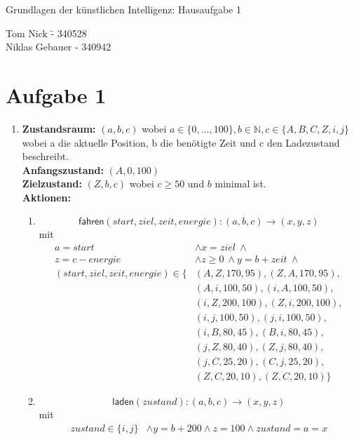 \documentclass[a4paper,10pt]{article}
\newcommand{\N}{\mathbb{N}}
\begin{document}
\begin{center}
\Large{Grundlagen der künstlichen Intelligenz: Hausaufgabe 1} \\
\end{center}
\begin{tabbing}
Tom Nick \hspace{2cm}\= - 340528\\
Niklas Gebauer \> - 340942 \\
\end{tabbing}

\section*{Aufgabe 1}

\begin{enumerate}[~~a)]
	\item
	\textbf{Zustandsraum:} 
	$(a, b, c)$ wobei $ a \in \{0,\dots,100\}, b \in \N, c \in \{A, B, C, Z, i, j\} $ \\
	wobei a die aktuelle Position, b die benötigte Zeit und c den Ladezustand beschreibt. \\
	\textbf{Anfangszustand:}
	$(A,0,100)$ \\
	\textbf{Zielzustand:}
	$(Z,b,c)$ wobei $c \ge 50$ und $b$ minimal ist. \\
	\textbf{Aktionen:}
	\begin{enumerate}[~~1.]
	\item $$\textsf{fahren}(start, ziel, zeit, energie): (a, b, c) \rightarrow (x, y, z)$$ 
	mit 
	\begin{align*}
		a = start &\land x = ziel ~\land \\
		z = c - energie  &\land z \ge 0 ~\land y = b + zeit ~\land\\
		(start, ziel, zeit, energie)  \in \{&(A, Z, 170, 95), (Z, A, 170, 95),\\
		&(A,i,100,50), (i,A,100,50),\\
		&(i,Z,200,100), (Z,i,200,100),\\
		&(i,j,100,50), (j,i,100,50),\\
		&(i,B,80,45), (B,i,80,45),\\
		&(j,Z,80,40), (Z,j,80,40),\\
		&(j,C,25,20), (C,j,25,20),\\
		&(Z,C,20,10), (Z,C,20,10)\}
	\end{align*}
	\item $$\textsf{laden}(zustand): (a, b, c) \rightarrow (x, y, z)$$ 
	mit 
	\begin{align*}
		zustand \in \{ i, j \} &\land y = b + 200 \land z = 100 \land zustand = a = x
	\end{align*}
	\end{enumerate}


\end{enumerate}
\end{document}
